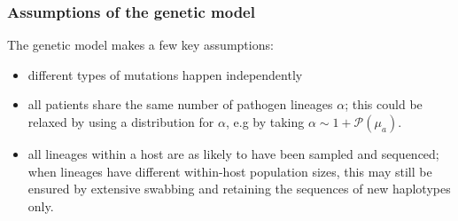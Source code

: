 \documentclass[10pt]{article}
\begin{document}
\subsubsection*{Assumptions of the genetic model}
The genetic model makes a few key assumptions:
\begin{itemize}
 \item different types of mutations happen independently
 \item all patients share the same number of pathogen lineages $\alpha$; this could be relaxed by using a distribution for $\alpha$, e.g by taking $\alpha \sim 1+\mathcal{P}(\mu_a)$.
 \item all lineages within a host are as likely to have been sampled and sequenced; when lineages have different within-host population sizes, this may still be ensured by extensive swabbing and retaining the sequences of new haplotypes only.
\end{itemize}



% 
\end{document}
